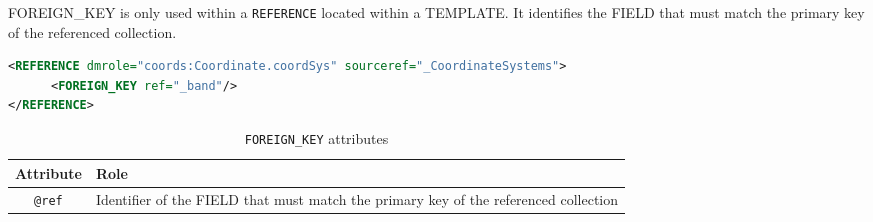 FOREIGN\_KEY is only used within a \texttt{REFERENCE} located within a TEMPLATE.
It identifies the FIELD that must  match the primary key of the referenced collection.

\begin{lstlisting}[caption={The \texttt{REFERENCE} is resolved by the \texttt{INSTANCE} of table \_CoordinateSystems that has a primary key equals to the value of the column  \_band},language=XML]
<REFERENCE dmrole="coords:Coordinate.coordSys" sourceref="_CoordinateSystems">
      <FOREIGN_KEY ref="_band"/>
</REFERENCE>
\end{lstlisting}

\begin{table}[!htbp]
\small
\centering
\begin{tabulary}{\linewidth}{|c|J|}       
       \hline 
            \textbf{Attribute} & 
            \textbf {Role}\\
       \hline         \hline  
             \texttt{@ref} &
             Identifier of the FIELD that must  match the primary key of the referenced collection \\
     \hline
     \end{tabulary}
     \caption{\texttt{FOREIGN\_KEY} attributes} 
     \label{tbl:foreignkey-att}
 \end{table}
